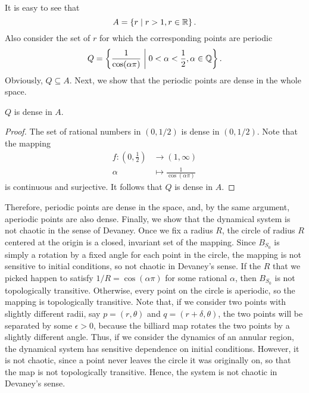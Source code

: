 \documentclass[10pt,twoside,draft]{book}
\begin{document}
It is easy to see that
\begin{equation*}
  A = \left \{ r \mathrel{} \middle| \mathrel{} r > 1, r \in \mathbb{R} \right \}.
\end{equation*}
Also consider the set of $r$ for which the corresponding points are periodic
\begin{equation*}
  Q = \left \{ \frac{1}{\cos(\alpha\pi)} \mathrel{} \middle| \mathrel{} 0 < \alpha < \frac{1}{2}, \alpha \in \mathbb{Q} \right \}.
\end{equation*}
Obviously, $Q \subseteq A$.
Next, we show that the periodic points are dense in the whole space.
\begin{proposition}
  $Q$ is dense in $A$.
  \begin{proof}
  The set of rational numbers in $(0,1/2)$ is dense in $(0,1/2)$.
  Note that the mapping
    \begin{align*}
      f: (0,\frac{1}{2}) &\to (1, \infty)  \\
      \alpha &\mapsto \frac{1}{\cos(\alpha\pi)}
    \end{align*}
  is continuous and surjective.
  It follows that $Q$ is dense in $A$.
  \end{proof}
\end{proposition}
Therefore, periodic points are dense in the space, and, by the same argument, aperiodic points are also dense.
Finally, we show that the dynamical system is not chaotic in the sense of Devaney.
Once we fix a radius $R$, the circle of radius $R$ centered at the origin is a closed, invariant set of the mapping.
Since $B_{S_0}$ is simply a rotation by a fixed angle for each point in the circle, the mapping is not sensitive to initial conditions, so not chaotic in Devaney's sense.
If the $R$ that we picked happen to satisfy $1/R = \cos(\alpha\pi)$ for some rational $\alpha$, then $B_{S_0}$ is not topologically transitive.
Otherwise, every point on the circle is aperiodic, so the mapping is topologically transitive.
Note that, if we consider two points with slightly different radii, say $p = (r, \theta)$ and $q = (r + \delta, \theta)$, the two points will be separated by some $\epsilon > 0$, because the billiard map rotates the two points by a slightly different angle.
Thus, if we consider the dynamics of an annular region, the dynamical system has sensitive dependence on initial conditions.
However, it is not chaotic, since a point never leaves the circle it was originally on, so that the map is not topologically transitive.
Hence, the system is not chaotic in Devaney's sense.
\end{document}
